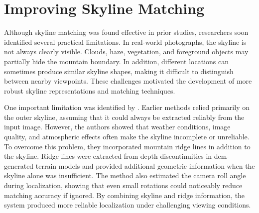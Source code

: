 %
%
%

\section{Improving Skyline Matching}

Although skyline matching was found effective in prior studies, researchers soon identified several practical limitations. In real-world photographs, the skyline is not always clearly visible. Clouds, haze, vegetation, and foreground objects may partially hide the mountain boundary. In addition, different locations can sometimes produce similar skyline shapes, making it difficult to distinguish between nearby viewpoints. These challenges motivated the development of more robust skyline representations and matching techniques.

One important limitation was identified by \cite{chen2015camera}. Earlier methods relied primarily on the outer skyline, assuming that it could always be extracted reliably from the input image. However, the authors showed that weather conditions, image quality, and atmospheric effects often make the skyline incomplete or unreliable. To overcome this problem, they incorporated mountain ridge lines in addition to the skyline. Ridge lines were extracted from depth discontinuities in \Gls{dem}-generated terrain models and provided additional geometric information when the skyline alone was insufficient. The method also estimated the camera roll angle during localization, showing that even small rotations could noticeably reduce matching accuracy if ignored. By combining skyline and ridge information, the system produced more reliable localization under challenging viewing conditions.

